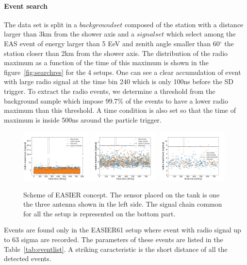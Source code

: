 \documentclass{PoS}
\begin{document}
\paragraph{Event search}
The data set is split in a $background set$ composed of the station with a distance larger than 3km from the shower axis and a $signal set$ which select among the EAS event of energy larger than 5 EeV and zenith angle smaller than 60$^{\circ}$ the station closer than 2km from the shower axis. The distribution of the radio maximum as a function of the time of this maximum is shown in the figure~\ref{fig:searchres} for the 4 setups. One can see a clear accumulation of event with large radio signal at the time bin 240 which is only 100ns before the SD trigger. To extract the radio events, we determine a threshold from the background sample which impose 99.7\% of the events to have a lower radio maximum than this threshold. A time condition is also set so that the time of maximum is inside 500ns around the particle trigger.
\begin{figure}[h]
\centering
\includegraphics[width=0.32\textwidth]{EA61_event.png}
\includegraphics[width=0.32\textwidth]{GDC_event.png}
\includegraphics[width=0.32\textwidth]{GDL_event.png}
\caption{Scheme of EASIER concept. The sensor  placed on the tank is one the three antenna shown in the left side. The signal chain common for all the setup is represented on the bottom part.}
\label{fig:eventsearch}
\end{figure}
Events are found only in the EASIER61 setup where event with radio signal up to 63 sigma are recorded. The parameters of these events are listed in the Table~\ref{tab:eventlist}. A striking caracteristic is the short distance of all the detected events. 
\end{document}
